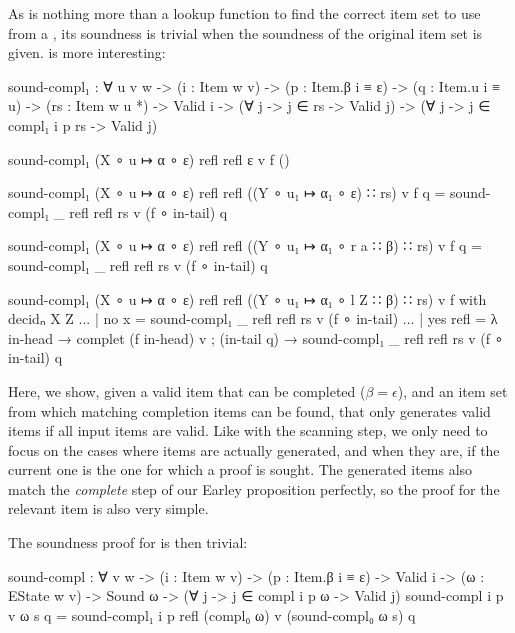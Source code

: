 		As  is nothing more than a lookup function to find
		the correct item set to use from a , its soundness is
		trivial when the soundness of the original item set is given.
		 is more interesting:

		\begin{code}
			  sound-compl₁ : ∀ {u v w} ->
			    (i : Item w v) ->
			    (p : Item.β i ≡ ε) ->
			    (q : Item.u i ≡ u) ->
			    (rs : Item w u *) ->
			    Valid i -> (∀ {j} -> j ∈ rs -> Valid j) ->
			    (∀ {j} -> j ∈ compl₁ i p rs -> Valid j)
			
			  sound-compl₁ (X ∘ u ↦ α ∘ ε) refl refl ε v f ()
			
			  sound-compl₁ (X ∘ u ↦ α ∘ ε) refl refl ((Y ∘ u₁ ↦ α₁ ∘ ε) ∷ rs) v f q =
			    sound-compl₁ _ refl refl rs v (f ∘ in-tail) q
			
			  sound-compl₁ (X ∘ u ↦ α ∘ ε) refl refl ((Y ∘ u₁ ↦ α₁ ∘ r a ∷ β) ∷ rs) v f q =
			    sound-compl₁ _ refl refl rs v (f ∘ in-tail) q
			
			  sound-compl₁ (X ∘ u ↦ α ∘ ε) refl refl ((Y ∘ u₁ ↦ α₁ ∘ l Z ∷ β) ∷ rs) v f  with decidₙ X Z
			  ... | no x = sound-compl₁ _ refl refl rs v (f ∘ in-tail)
			  ... | yes refl =
			    λ { in-head → complet (f in-head) v
			      ; (in-tail q) → sound-compl₁ _ refl refl rs v (f ∘ in-tail) q
			      }
		\end{code}

		Here, we show, given a valid item that can be completed ($\beta =
		\epsilon$), and an item set from which matching completion items can be
		found, that  only generates valid items if all input
		items are valid. Like with the scanning step, we only need to focus on
		the cases where items are actually generated, and when they are, if the
		current one is the one for which a proof is sought. The generated items
		also match the \emph{complete} step of our Earley proposition
		perfectly, so the proof for the relevant item is also very simple.

		The soundness proof for  is then trivial:

		\begin{code}
			  sound-compl : ∀ {v w} ->
			    (i : Item w v) ->
			    (p : Item.β i ≡ ε) ->
			    Valid i -> (ω : EState w v) -> Sound ω ->
			    (∀ {j} -> j ∈ compl i p ω -> Valid j)
			  sound-compl i p v ω s q =
			    sound-compl₁ i p refl (compl₀ ω) v (sound-compl₀ ω s) q
		\end{code}

